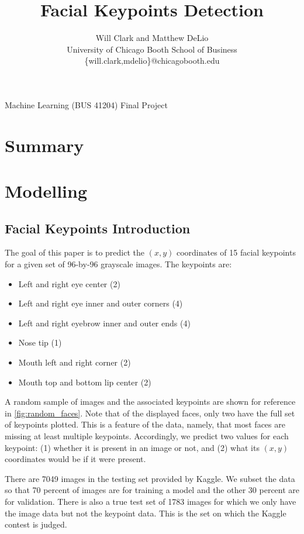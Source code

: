 \documentclass[journal]{IEEEtran}
\begin{document}
\title{Facial Keypoints Detection}
\author{Will Clark and Matthew DeLio\\
University of Chicago Booth School of Business\\
\textsf{\{will.clark,mdelio\}@chicagobooth.edu}}

{Machine Learning (BUS 41204) Final Project}

\maketitle

\section{Summary}

\section{Modelling}

\subsection{Facial Keypoints Introduction}\label{intro}

The goal of this paper is to predict the $(x,y)$ coordinates of 15 facial keypoints for a given set of 96-by-96 grayscale images. The keypoints are:
\begin{itemize}
\item Left and right eye center (2)
\item Left and right eye inner and outer corners (4)
\item Left and right eyebrow inner and outer ends (4)
\item Nose tip (1)
\item Mouth left and right corner (2)
\item Mouth top and bottom lip center (2)
\end{itemize}
A random sample of images and the associated keypoints are shown for reference in \cref{fig:random_faces}. Note that of the displayed faces, only two have the full set of keypoints plotted. This is a feature of the data, namely, that most faces are missing at least multiple keypoints. Accordingly, we predict two values for each keypoint: (1) whether it is present in an image or not, and (2) what its $(x,y)$ coordinates would be if it were present.

There are 7049 images in the testing set provided by Kaggle. We subset the data so that 70 percent of images are for training a model and the other 30 percent are for validation. There is also a true test set of 1783 images for which we only have the image data but not the keypoint data. This is the set on which the Kaggle contest is judged.
\end{document}

